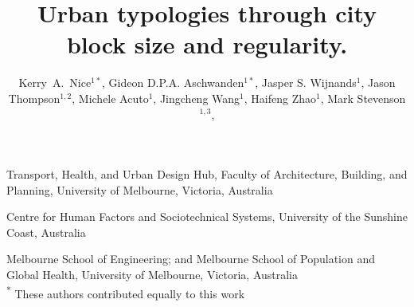 \documentclass{nature}
\title{Urban typologies through city block size and regularity.}
\author{Kerry~A.~Nice$^{1*}$,
Gideon D.P.A. Aschwanden$^{1*}$,
Jasper S. Wijnands$^{1}$,
Jason Thompson$^{1,2}$,
Michele Acuto$^{1}$,
Jingcheng Wang$^{1}$,
Haifeng Zhao$^{1}$,
Mark Stevenson$^{1,3}$,
}
\begin{document}
\maketitle

\begin{affiliations}
 \item Transport, Health, and Urban Design Hub, Faculty of Architecture, Building, and Planning, University of Melbourne, Victoria, Australia
 \item Centre for Human Factors and Sociotechnical Systems, University of the Sunshine Coast, Australia
 \item Melbourne School of Engineering; and Melbourne School of Population and Global Health, University of Melbourne, Victoria, Australia
 \\ \textsuperscript{*} These authors contributed equally to this work
\end{affiliations}
\end{document}
